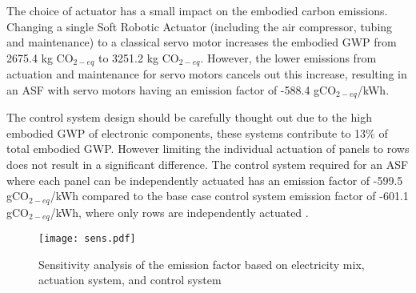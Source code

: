 The choice of actuator has a small impact on the embodied carbon emissions. Changing a single Soft Robotic Actuator (including the air compressor, tubing and maintenance) to a classical servo motor increases the embodied GWP from 2675.4 kg CO$_{2-eq}$ to 3251.2 kg CO$_{2-eq}$. However, the lower emissions from actuation and maintenance for servo motors cancels out this increase, resulting in an ASF with servo motors having an emission factor of -588.4 gCO$_{2-eq}$/kWh.

The control system design should be carefully thought out due to the high embodied GWP of electronic components, these systems contribute to 13\% of total embodied GWP. However limiting the individual actuation of panels to rows does not result in a significant difference. The control system required for an ASF where each panel can be independently actuated has an emission factor of -599.5 gCO$_{2-eq}$/kWh compared to the base case control system emission factor of -601.1 gCO$_{2-eq}$/kWh, where only rows are independently actuated .\\



\begin{figure}[H]
\begin{center}
\texttt{[image: sens.pdf]}
\caption{Sensitivity analysis of the emission factor based on electricity mix, actuation system, and control system}
\label{fig:sens}
\end{center}
\end{figure}

